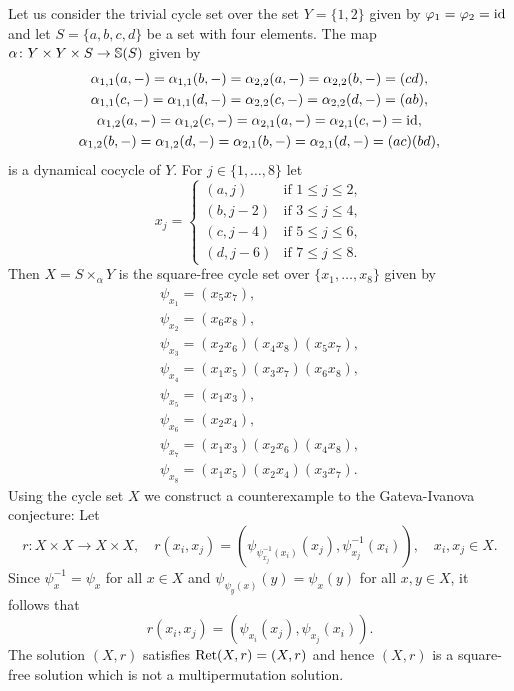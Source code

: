 \begin{example}
	\label{exa:counterexample}
	Let us consider the trivial cycle set over the set $Y=\{1,2\}$ given by
	$\varphi_1=\varphi_2=\operatorname{id}$ and let $S=\{a,b,c,d\}$ be a set with four
	elements.  The map $\alpha\colon Y\times Y\times S\to\mathbb{S}(S)$ given by
	\begin{gather*}
		\alpha_{1,1}(a,-)=\alpha_{1,1}(b,-)=\alpha_{2,2}(a,-)=\alpha_{2,2}(b,-)=(cd),\\
		\alpha_{1,1}(c,-)=\alpha_{1,1}(d,-)=\alpha_{2,2}(c,-)=\alpha_{2,2}(d,-)=(ab),\\
		\alpha_{1,2}(a,-)=\alpha_{1,2}(c,-)=\alpha_{2,1}(a,-)=\alpha_{2,1}(c,-)=\operatorname{id},\\
		\alpha_{1,2}(b,-)=\alpha_{1,2}(d,-)=\alpha_{2,1}(b,-)=\alpha_{2,1}(d,-)=(ac)(bd),
	\end{gather*}
	is a dynamical cocycle of $Y$.  
	For $j\in\{1,\dots,8\}$ let 
	\[
    x_j=\begin{cases}
        (a,j)    &  \text{if $1\leq j\leq 2$},\\
        (b,j-2)  &  \text{if $3\leq j\leq 4$},\\
        (c,j-4)  &  \text{if $5\leq j\leq 6$},\\
        (d,j-6)  &  \text{if $7\leq j\leq 8$}.
    \end{cases}
	\]
	Then $X=S\times_\alpha Y$ is the square-free cycle set over 
	$\{x_1,\dots,x_8\}$ given by 
	\begin{gather*}
		\psi_{x_1}=(x_5x_7),\\
		\psi_{x_2}=(x_6x_8),\\
		\psi_{x_3}=(x_2x_6)(x_4x_8)(x_5x_7),\\
		\psi_{x_4}=(x_1x_5)(x_3x_7)(x_6x_8),\\
		\psi_{x_5}=(x_1x_3),\\
		\psi_{x_6}=(x_2x_4),\\
		\psi_{x_7}=(x_1x_3)(x_2x_6)(x_4x_8),\\
		\psi_{x_8}=(x_1x_5)(x_2x_4)(x_3x_7).
	\end{gather*}
	Using the cycle set $X$ we construct a counterexample to 
	the Gateva-Ivanova conjecture: 
	Let
	\[
		r\colon X\times X\to X\times X,\quad
        r(x_i,x_j)=(\psi_{\psi_{x_j}^{-1}(x_i)}(x_j),\psi^{-1}_{x_j}(x_i)),\quad
		x_i,x_j\in X.
	\]
    Since $\psi_x^{-1}=\psi_x$ for all $x\in X$ and
    $\psi_{\psi_y(x)}(y)=\psi_x(y)$ for all $x,y\in X$, it follows that
    \[
    r(x_i,x_j)=(\psi_{x_i}(x_j),\psi_{x_j}(x_i)).
    \]
    The solution $(X,r)$ satisfies $\operatorname{Ret}(X,r)=(X,r)$ and hence 
    $(X,r)$ is a square-free
    solution which is not a multipermutation solution.
\end{example}

